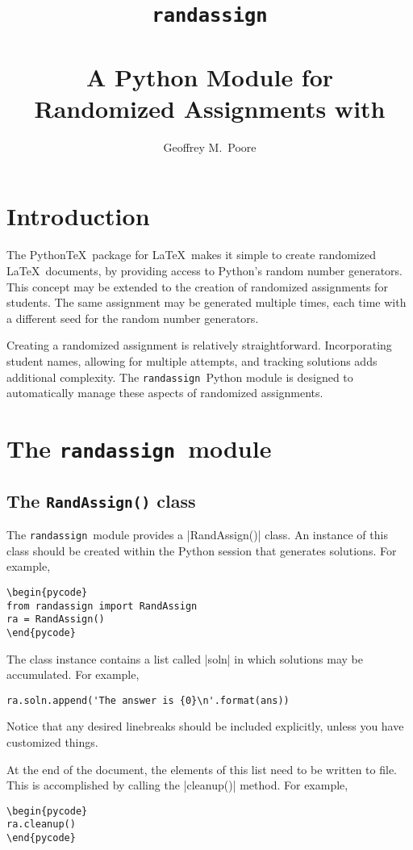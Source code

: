 \documentclass[11pt]{article}
\title{\texttt{randassign} \\~\\ A Python Module for \\ Randomized Assignments with \pytex}
\author{Geoffrey M.\ Poore}
\date{}
\newcommand{\pytex}{Python\TeX}
\newcommand{\ra}{\texttt{randassign}}
\begin{document}
\maketitle


\section{Introduction}

The \pytex\ package for \LaTeX\ makes it simple to create randomized \LaTeX\ documents, by providing access to Python's random number generators.  
This concept may be extended to the creation of randomized assignments for students.  The same assignment may be generated multiple times, each time with a different seed for the random number generators.

Creating a randomized assignment is relatively straightforward.  Incorporating student names, allowing for multiple attempts, and tracking solutions adds additional complexity.  The \ra\ Python module is designed to automatically manage these aspects of randomized assignments.


\section{The \ra\ module}

\subsection{The \texttt{RandAssign()} class}

The \ra\ module provides a |RandAssign()| class.  An instance of this class should be created within the Python session that generates solutions.  For example,
\begin{Verbatim}
\begin{pycode}
from randassign import RandAssign
ra = RandAssign()
\end{pycode}
\end{Verbatim}

The class instance contains a list called |soln| in which solutions may be accumulated.  For example,
\begin{Verbatim}
ra.soln.append('The answer is {0}\n'.format(ans))
\end{Verbatim}
Notice that any desired linebreaks should be included explicitly, unless you have customized things.

At the end of the document, the elements of this list need to be written to file.  This is accomplished by calling the |cleanup()| method.  For example, 
\begin{Verbatim}
\begin{pycode}
ra.cleanup()
\end{pycode}
\end{Verbatim}
\end{document}

